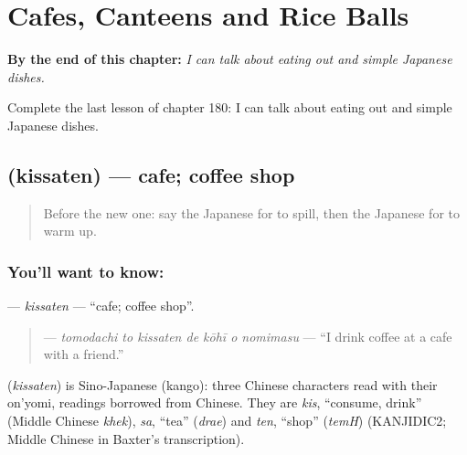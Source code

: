 
\chapter{Cafes, Canteens and Rice Balls}
\label{ch:ja-cafes-canteens-and-rice-balls}

\begin{chapteropening}
\textbf{By the end of this chapter:} \emph{I can talk about eating out and simple Japanese dishes.}

Complete the last lesson of chapter 180: I can talk about eating out and simple Japanese dishes.
\end{chapteropening}

\section[\texorpdfstring{\ja{きっさてん} (kissaten)}{きっさてん (kissaten)}]{ (kissaten) — cafe; coffee shop}

\label{lesson:JA-C180-kissaten}



\begin{quote}
Before the new one: say the Japanese for to spill, then the Japanese for to warm up.
\end{quote}

\subsection*{You'll want to know: }
\textbf{} — \emph{kissaten} — \textquotedblleft{}cafe; coffee shop\textquotedblright{}.

\begin{quote}
\textbf{   } — \emph{tomodachi to kissaten de kōhī o nomimasu} — \textquotedblleft{}I drink coffee at a cafe with a friend.\textquotedblright{}
\end{quote}

\begin{cousinweb}
\textbf{} (\emph{kissaten}) is Sino-Japanese (kango): three Chinese characters read with their on'yomi, readings borrowed from Chinese. They are \emph{kis}, \textquotedblleft{}consume, drink\textquotedblright{} (Middle Chinese \emph{khek}), \emph{sa}, \textquotedblleft{}tea\textquotedblright{} (\emph{drae}) and \emph{ten}, \textquotedblleft{}shop\textquotedblright{} (\emph{temH}) (KANJIDIC2; Middle Chinese in Baxter's transcription).
\end{cousinweb}

